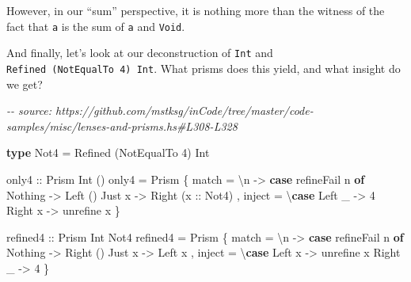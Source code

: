 \documentclass[]{article}
\newenvironment{Shaded}{}{}
\newcommand{\CommentTok}[1]{\textcolor[rgb]{0.38,0.63,0.69}{\textit{#1}}}
\newcommand{\DataTypeTok}[1]{\textcolor[rgb]{0.56,0.13,0.00}{#1}}
\newcommand{\DecValTok}[1]{\textcolor[rgb]{0.25,0.63,0.44}{#1}}
\newcommand{\KeywordTok}[1]{\textcolor[rgb]{0.00,0.44,0.13}{\textbf{#1}}}
\newcommand{\NormalTok}[1]{#1}
\newcommand{\OtherTok}[1]{\textcolor[rgb]{0.00,0.44,0.13}{#1}}
\begin{document}
However, in our ``sum'' perspective, it is nothing more than the witness of the
fact that \texttt{a} is the sum of \texttt{a} and \texttt{Void}.

And finally, let's look at our deconstruction of \texttt{Int} and
\texttt{Refined\ (NotEqualTo\ 4)\ Int}. What prisms does this yield, and what
insight do we get?

\begin{Shaded}
\begin{Highlighting}[]
\CommentTok{{-}{-} source: https://github.com/mstksg/inCode/tree/master/code{-}samples/misc/lenses{-}and{-}prisms.hs\#L308{-}L328}

\KeywordTok{type} \DataTypeTok{Not4} \OtherTok{=} \DataTypeTok{Refined}\NormalTok{ (}\DataTypeTok{NotEqualTo} \DecValTok{4}\NormalTok{) }\DataTypeTok{Int}

\OtherTok{only4 ::} \DataTypeTok{Prism\textquotesingle{}} \DataTypeTok{Int}\NormalTok{ ()}
\NormalTok{only4 }\OtherTok{=} \DataTypeTok{Prism\textquotesingle{}}
\NormalTok{    \{ match  }\OtherTok{=}\NormalTok{ \textbackslash{}n }\OtherTok{{-}\textgreater{}} \KeywordTok{case}\NormalTok{ refineFail n }\KeywordTok{of}
        \DataTypeTok{Nothing} \OtherTok{{-}\textgreater{}} \DataTypeTok{Left}\NormalTok{ ()}
        \DataTypeTok{Just}\NormalTok{ x  }\OtherTok{{-}\textgreater{}} \DataTypeTok{Right}\NormalTok{ (}\OtherTok{x ::} \DataTypeTok{Not4}\NormalTok{)}
\NormalTok{    , inject }\OtherTok{=}\NormalTok{ \textbackslash{}}\KeywordTok{case}
        \DataTypeTok{Left}\NormalTok{  \_ }\OtherTok{{-}\textgreater{}} \DecValTok{4}
        \DataTypeTok{Right}\NormalTok{ x }\OtherTok{{-}\textgreater{}}\NormalTok{ unrefine x}
\NormalTok{    \}}

\OtherTok{refined4 ::} \DataTypeTok{Prism\textquotesingle{}} \DataTypeTok{Int} \DataTypeTok{Not4}
\NormalTok{refined4 }\OtherTok{=} \DataTypeTok{Prism\textquotesingle{}}
\NormalTok{    \{ match  }\OtherTok{=}\NormalTok{ \textbackslash{}n }\OtherTok{{-}\textgreater{}} \KeywordTok{case}\NormalTok{ refineFail n }\KeywordTok{of}
        \DataTypeTok{Nothing} \OtherTok{{-}\textgreater{}} \DataTypeTok{Right}\NormalTok{ ()}
        \DataTypeTok{Just}\NormalTok{ x  }\OtherTok{{-}\textgreater{}} \DataTypeTok{Left}\NormalTok{ x}
\NormalTok{    , inject }\OtherTok{=}\NormalTok{ \textbackslash{}}\KeywordTok{case}
        \DataTypeTok{Left}\NormalTok{  x }\OtherTok{{-}\textgreater{}}\NormalTok{ unrefine x}
        \DataTypeTok{Right}\NormalTok{ \_ }\OtherTok{{-}\textgreater{}} \DecValTok{4}
\NormalTok{    \}}
\end{Highlighting}
\end{Shaded}
\end{document}
